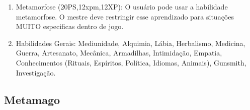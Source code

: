 \begin{enumerate}
		\item Metamorfose (20PS,12xpm,12XP): O usuário pode usar a habilidade metamorfose. O mestre deve restringir esse aprendizado para situações MUITO especificas dentro de jogo.

	
	\item Habilidades Gerais: Mediunidade, Alquimia, Lábia, Herbalismo, Medicina, Guerra, Artesanato, Mecânica, Armadilhas, Intimidação, Empatia, Conhecimentos (Rituais, Espíritos, Política, Idiomas, Animais), Gunsmith, Investigação.
\end{enumerate}


\subsection{Metamago}
  
